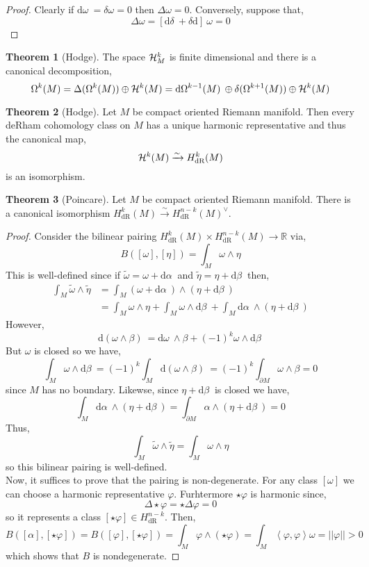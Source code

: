 \documentclass[12pt]{extarticle}
\newcommand{\R}{\mathbb{R}}
\renewcommand{\d}[1]{ \mathrm{d}#1 \:}
\theoremstyle{definition}
\newtheorem{theorem}{Theorem}[section]
\newcommand{\inner}[2]{\left< #1, #2 \right>}
\begin{document}
\begin{proof}
Clearly if $\d{\omega} = \delta{\omega} = 0$ then $\Delta \omega = 0$. Conversely, suppose that,
\[ \Delta \omega = [\d \delta + \delta \d] \omega = 0 \]
\end{proof}

\begin{theorem}[Hodge]
The space $\mathcal{H}^k_M$ is finite dimensional and there is a canonical decomposition,
\[ \Omega^k(M) = \Delta(\Omega^k(M)) \oplus \Har^k(M) = \d{\Omega^{k-1}(M)} \oplus \delta(\Omega^{k+1}(M)) \oplus \Har^k(M) \]
\end{theorem}

\begin{theorem}[Hodge]
Let $M$ be compact oriented Riemann manifold. Then every deRham cohomology class on $M$ has a unique harmonic representative and thus the canonical map,
\[ \mathcal{H}^k(M) \xrightarrow{\sim} H_{\text{dR}}^k(M) \]
is an isomorphism.
\end{theorem}

\begin{theorem}[Poincare]
Let $M$ be compact oriented Riemann manifold. There is a canonical isomorphism $H^k_{\mathrm{dR}}(M) \xrightarrow{\sim} H^{n-k}_{\mathrm{dR}}(M)^\vee$. 
\end{theorem}

\begin{proof}
Consider the bilinear pairing $H^k_{\mathrm{dR}}(M) \times H^{n-k}_{\mathrm{dR}}(M) \to \R$ via,
\[ B([\omega], [\eta]) = \int_M \omega \wedge \eta \]
This is well-defined since if $\tilde{\omega} = \omega + \d{\alpha}$ and $\tilde{\eta} = \eta + \d{\beta}$ then,
\begin{align*}
\int_M \tilde{\omega} \wedge \tilde{\eta} & = \int_M (\omega + \d{\alpha}) \wedge (\eta  + \d{\beta}) 
\\
& = \int_M \omega \wedge \eta + \int_M \omega \wedge \d{\beta} + \int_M \d{\alpha} \wedge (\eta + \d{\beta}) 
\end{align*}
However,
\[ \d{(\omega \wedge \beta)} = \d{\omega} \wedge \beta + (-1)^k \omega \wedge
 \d{\beta} \]
But $\omega$ is closed so we have,
\[ \int_M \omega \wedge
 \d{\beta} = (-1)^k \int_M \d{(\omega \wedge \beta)} = (-1)^k \int_{\partial M} \omega \wedge \beta = 0 \]
since $M$ has no boundary. Likewse, since $\eta + \d{\beta}$ is closed we have,
\[ \int_M \d{\alpha} \wedge (\eta + \d{\beta}) = \int_{\partial M} \alpha \wedge (\eta + \d{\beta}) = 0 \]
Thus,
\[ \int_M \tilde{\omega} \wedge \tilde{\eta} = \int_M \omega \wedge \eta \]
so this bilinear pairing is well-defined. 
\bigskip\\
Now, it suffices to prove that the pairing is non-degenerate. For any class $[\omega]$ we can choose a harmonic representative $\varphi$. Furhtermore $\star \varphi$ is harmonic since,
\[ \Delta \star \varphi = \star \Delta \varphi = 0 \]
so it represents a class $[\star \varphi] \in H^{n-k}_{\text{dR}}$. Then,
\[ B([\alpha], [\star \varphi]) = B([\varphi], [\star \varphi]) = \int_M \varphi \wedge (\star \varphi) = \int_M \inner{\varphi}{\varphi} \omega = || \varphi || > 0 \]
which shows that $B$ is nondegenerate. 
\end{proof}
\end{document}
